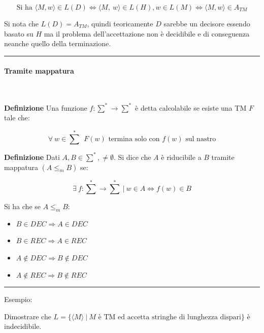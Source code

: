 \documentclass{article}
\begin{document}
$$\text{Si ha } \langle M,w\rangle\in L(D) \iff\langle M,\ w\rangle\in L(H),w\in L(M)\iff \langle M,w\rangle\in A_{TM}$$\newline

\noindent Si nota che $L(D)=A_{TM}$, quindi teoricamente $D$ sarebbe un decisore essendo basato su $H$ ma il problema dell'accettazione non è decidibile e di conseguenza neanche quello della terminazione.\newline

\noindent\rule{\textwidth}{0.5pt}\newline

\paragraph{Tramite mappatura} $\ $\newline

\noindent\textbf{Definizione} Una funzione $f:\sum^*\rightarrow\sum^*$ è detta calcolabile se esiste una TM $F$ tale che:

$$\forall\ w\in {\sum}^*\ \ F(w) \text{ termina solo con $f(w)$ sul nastro}$$\newline

\noindent\textbf{Definizione} Dati $A,B\in \sum^*, \neq \emptyset$. Si dice che $A$ è riducibile a $B$ tramite mappatura $(A\leq_m B)$ se:

$$\exists\ f:\sum^*\rightarrow\sum^*\ |\ w\in A \iff f(w)\in B$$\newline

\noindent Si ha che se $A\leq_m B$:
\begin{itemize}
    \item $B\in DEC \Rightarrow A\in DEC$
    \item $B\in REC \Rightarrow A\in REC$
    \item $A\notin DEC \Rightarrow B\notin DEC$
    \item $A\notin REC \Rightarrow B\notin REC$\newline
\end{itemize}

\noindent\rule{\textwidth}{0.5pt}\newline

\noindent Esempio:\newline

\noindent Dimostrare che $L=\{\langle M\rangle\ |\ M \text{ è TM ed accetta stringhe di lunghezza dispari}\}$ è indecidibile.\newline
\end{document}
